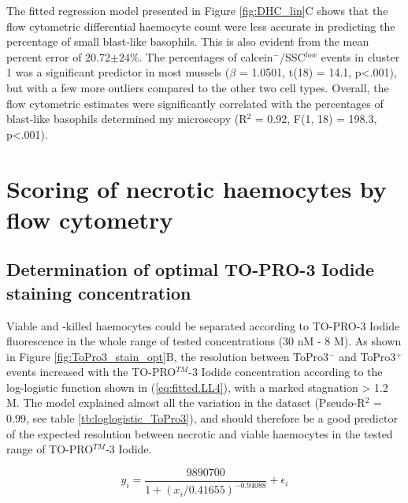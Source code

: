 The fitted regression model presented in Figure \ref{fig:DHC_lin}C shows that the flow cytometric differential haemocyte count were less accurate in predicting the percentage of small blast-like basophils. This is also evident from the mean percent error of 20.72$\pm{24}$\%. The percentages of calcein$^{-}$/SSC$^{low}$ events in cluster 1 was a significant predictor in most mussels ($\beta$ = 1.0501, t(18) = 14.1, p<.001), but with a few more outliers compared to the other two cell types. Overall, the flow cytometric estimates were significantly correlated with the percentages of blast-like basophils determined my microscopy (R$^{2}$ = 0.92, F(1, 18) = 198.3, p<.001).

\section{Scoring of necrotic haemocytes by flow cytometry}
\subsection{Determination of optimal TO-PRO-3 Iodide staining concentration}
Viable and -killed haemocytes could be separated according to TO-PRO-3 Iodide fluorescence in the whole range of tested concentrations (30 nM - 8 \micro M). As shown in Figure \ref{fig:ToPro3_stain_opt}B, the resolution between ToPro3$^{-}$ and ToPro3$^{+}$ events increased with the TO-PRO$^{TM}$-3 Iodide concentration according to the log-logistic function shown in (\ref{eq:fitted.LL4}), with a marked stagnation > 1.2 \micro M. The model explained almost all the variation in the dataset (Pseudo-R$^{2}$ = 0.99, see table \ref{tb:loglogistic_ToPro3}), and should therefore be a good predictor of the expected resolution between necrotic and viable haemocytes in the tested range of TO-PRO$^{TM}$-3 Iodide.

\begin{equation}
\label{eq:fitted.LL4}
y_{i} = \dfrac{9890700}{1 + (x_i / 0.41655)^{-0.94088}} + \epsilon_i
\end{equation}

